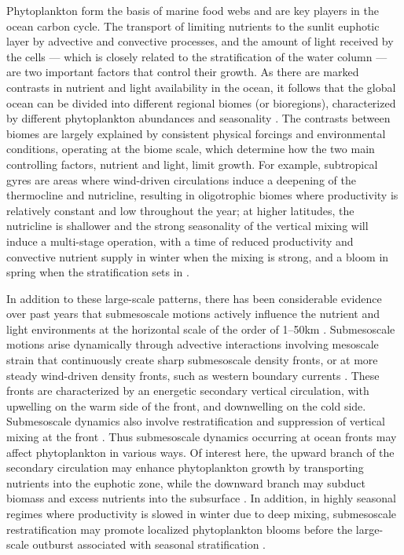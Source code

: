 \introduction{}

Phytoplankton form the basis of marine food webs and are key players in the ocean carbon cycle.
The transport of limiting nutrients to the sunlit euphotic layer by advective and convective processes, and the amount of light received by the cells --- which is closely related to the stratification of the water column --- are two important factors that control their growth.
As there are marked contrasts in nutrient and light availability in the ocean, it follows that the global ocean can be divided into different regional biomes (or bioregions), characterized by different phytoplankton abundances and seasonality \citep{longhurst_2007, vichi_2011a, bock_2022}.
The contrasts between biomes are largely explained by consistent physical forcings and environmental conditions, operating at the biome scale, which determine how the two main controlling factors, nutrient and light, limit growth.
For example, subtropical gyres are areas where wind-driven circulations induce a deepening of the thermocline and nutricline, resulting in oligotrophic biomes where productivity is relatively constant and low throughout the year; at higher latitudes, the nutricline is shallower and the strong seasonality of the vertical mixing will induce a multi-stage operation, with a time of reduced productivity and convective nutrient supply in winter when the mixing is strong, and a bloom in spring when the stratification sets in \citep{wilson_2005, williams_2011}.

In addition to these large-scale patterns, there has been considerable evidence over past years that submesoscale motions actively influence the nutrient and light environments at the horizontal scale of the order of 1--50km \citep[see reviews by][]{levy_2012, mahadevan_2016, levy_2018}.
Submesoscale motions arise dynamically through advective interactions involving mesoscale strain that continuously create sharp submesoscale density fronts, or at more steady wind-driven density fronts, such as western boundary currents \citep{thomas_2008, mcwilliams_2016, mahadevan_2020}.
These fronts are characterized by an energetic secondary vertical circulation, with upwelling on the warm side of the front, and downwelling on the cold side.
Submesoscale dynamics also involve restratification and suppression of vertical mixing at the front \citep{thomas_2008a}.
Thus submesoscale dynamics occurring at ocean fronts may affect phytoplankton in various ways.
Of interest here, the upward branch of the secondary circulation may enhance phytoplankton growth by transporting nutrients into the euphotic zone, while the downward branch may subduct biomass and excess nutrients into the subsurface \citep{calil_2011, omand_2015, hauschildt_2021}.
In addition, in highly seasonal regimes where productivity is slowed in winter due to deep mixing, submesoscale restratification may promote localized phytoplankton blooms before the large-scale outburst associated with seasonal stratification \citep{mahadevan_2012}.

